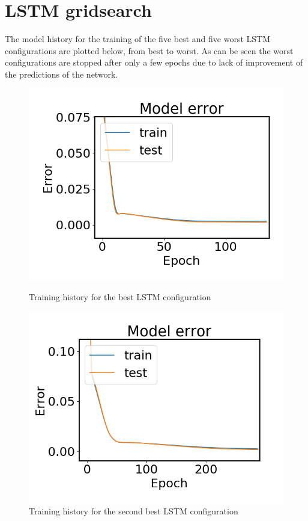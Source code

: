 \chapter{LSTM gridsearch}\label{appendix:lstm_grid}
    The model history for the training of the five best and five worst LSTM configurations are plotted below, from best to worst. As can be seen the worst configurations are stopped after only a few epochs due to lack of improvement of the predictions of the network. 
    \begin{figure}
        \begin{minipage}[b]{0.49\linewidth}
            \centering
            \includegraphics[width = \textwidth]{report/figures/analysis/lstm_gridsearch/best_lstm_error_zoomed.png}
            \caption{Training history for the best LSTM configuration}
            \label{fig:lstm_grid_error_best_appendix}
        \end{minipage}
        \hfill\vline\hfill
        \begin{minipage}[b]{0.49\linewidth}
            \centering
            \includegraphics[width = \textwidth]{report/figures/analysis/lstm_gridsearch/best_lstm_error_2_zoomed.png}
            \caption{Training history for the second best LSTM configuration}
            \label{fig:lstm_grid_error_worst_appendix}
        \end{minipage}
    \end{figure}

